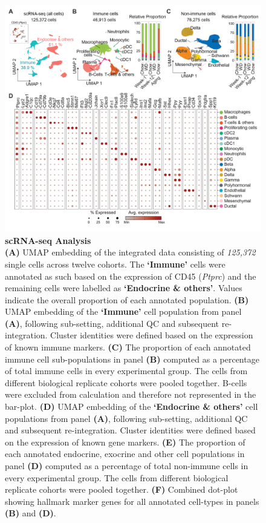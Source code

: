 \begin{figure}[H]
\centering
\includegraphics[width=\linewidth]{Chapter4/Fig/F2-3-01.png}
\caption[res-scR]{\textbf{scRNA-seq Analysis}\\
\textbf{(A)} UMAP embedding of the integrated data consisting of \textit{125,372} single cells across twelve cohorts. The \textbf{‘Immune’} cells were annotated as such based on the expression of CD45 (\textit{Ptprc}) and the remaining cells were labelled as \textbf{‘Endocrine \& others’}. Values indicate the overall proportion of each annotated population. \textbf{(B)} UMAP embedding of the \textbf{‘Immune’} cell population from panel \textbf{(A)}, following sub-setting, additional QC and subsequent re-integration. Cluster identities were defined based on the expression of known immune markers. \textbf{(C)} The proportion of each annotated immune cell sub-populations in panel \textbf{(B)} computed as a percentage of total immune cells in every experimental group. The cells from different biological replicate cohorts were pooled together. B-cells were excluded from calculation and therefore not represented in the bar-plot. \textbf{(D)} UMAP embedding of the \textbf{‘Endocrine \& others’} cell populations from panel \textbf{(A)}, following sub-setting, additional QC and subsequent re-integration. Cluster identities were defined based on the expression of known gene markers. \textbf{(E)} The proportion of each annotated endocrine, exocrine and other cell populations in panel \textbf{(D)} computed as a percentage of total non-immune cells in every experimental group. The cells from different biological replicate cohorts were pooled together. \textbf{(F)} Combined dot-plot showing hallmark  marker genes for all annotated cell-types in panels \textbf{(B)} and \textbf{(D)}.}
\label{fig2-3}
\end{figure}

